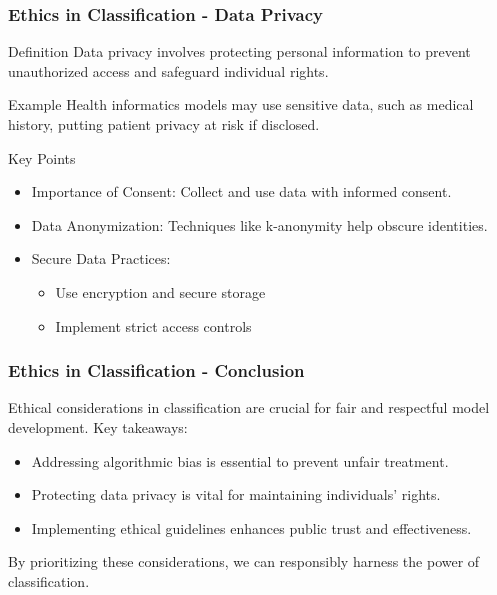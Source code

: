 \documentclass[aspectratio=169]{beamer}
\begin{document}
\begin{frame}[fragile]
    \frametitle{Ethics in Classification - Data Privacy}
    \begin{block}{Definition}
        Data privacy involves protecting personal information to prevent unauthorized access and safeguard individual rights.
    \end{block}
    
    \begin{block}{Example}
        Health informatics models may use sensitive data, such as medical history, putting patient privacy at risk if disclosed.
    \end{block}
    
    \begin{block}{Key Points}
        \begin{itemize}
            \item Importance of Consent: Collect and use data with informed consent.
            \item Data Anonymization: Techniques like k-anonymity help obscure identities.
            \item Secure Data Practices:
                \begin{itemize}
                    \item Use encryption and secure storage
                    \item Implement strict access controls
                \end{itemize}
        \end{itemize}
    \end{block}
\end{frame}

\begin{frame}[fragile]
    \frametitle{Ethics in Classification - Conclusion}
    Ethical considerations in classification are crucial for fair and respectful model development. Key takeaways:
    \begin{itemize}
        \item Addressing algorithmic bias is essential to prevent unfair treatment.
        \item Protecting data privacy is vital for maintaining individuals' rights.
        \item Implementing ethical guidelines enhances public trust and effectiveness.
    \end{itemize}
    
    By prioritizing these considerations, we can responsibly harness the power of classification.
\end{frame}
\end{document}

